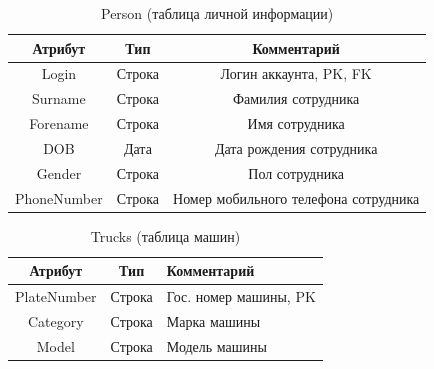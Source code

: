 \begin{table}[h] \label{pers_table}
	\begin{center}
		\caption{Person (таблица личной информации)}
		\begin{tabular}{| c | c | c |}
			\hline
			\textbf{Атрибут}		&	\textbf{Тип}		& \textbf{Комментарий} \\
			\hline
			Login 		&	Строка		&	Логин аккаунта, PK, FK \\ \hline
			Surname 	&	Строка 		&	Фамилия сотрудника \\ \hline
			Forename 	&	Строка 		&	Имя сотрудника \\ \hline
			DOB 		&	Дата		&	Дата рождения сотрудника \\ \hline
			Gender 		&   Строка		&	Пол сотрудника \\ \hline
			PhoneNumber	&   Строка		&	Номер мобильного телефона сотрудника \\ \hline
		\end{tabular}
	\end{center}
\end{table}

\begin{table}[h!] \label{truck_table}
	\begin{center}
		\caption{Trucks (таблица машин)}
		\begin{tabular}{| c | c | p{10cm} |}
			\hline
			\textbf{Атрибут}		&	\textbf{Тип}		& \textbf{Комментарий} \\
			\hline
			PlateNumber	&	Строка	&	Гос. номер машины, PK \\ \hline
			Category	&	Строка	&	Марка машины \\ \hline
			Model		&	Строка	&	Модель машины \\ \hline
		\end{tabular}
	\end{center}
\end{table}

